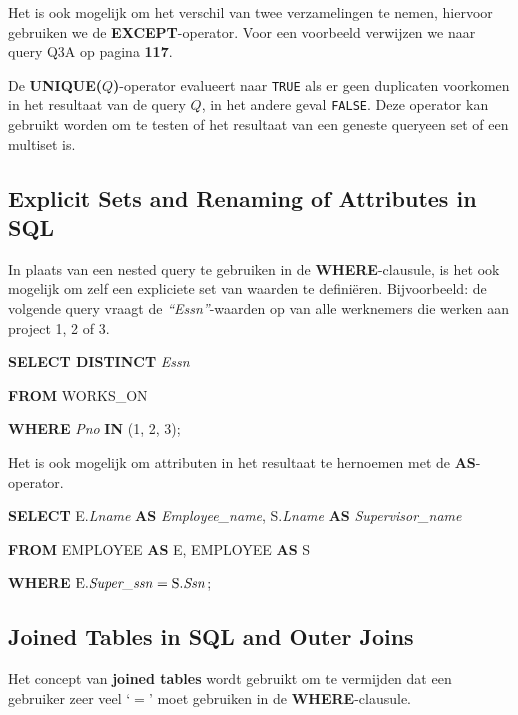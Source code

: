 \noindent Het is ook mogelijk om het verschil van twee verzamelingen te nemen, hiervoor gebruiken we de \textbf{EXCEPT}-operator. Voor een voorbeeld verwijzen we naar query Q3A op pagina \textbf{117}.

De \textbf{UNIQUE($Q$)}-operator evalueert naar \texttt{TRUE} als er geen duplicaten voorkomen in het resultaat van de query $Q$, in het andere geval \texttt{FALSE}. Deze operator kan gebruikt worden om te testen of het resultaat van een geneste queryeen set of een multiset is.


\subsection{Explicit Sets and Renaming of Attributes in SQL}
In plaats van een nested query te gebruiken in de \textbf{WHERE}-clausule, is het ook mogelijk om zelf een expliciete set van waarden te defini\"eren. Bijvoorbeeld: de volgende query vraagt de \textit{``Essn''}-waarden op van alle werknemers die werken aan project 1, 2 of 3.

\vspace{1mm}\hspace{10mm}
\textbf{SELECT DISTINCT} \textit{Essn}

\hspace{10mm}
\textbf{FROM} WORKS\_ON

\hspace{10mm}
\textbf{WHERE} \textit{Pno} \textbf{IN} (1, 2, 3);
\vspace{3mm}

\noindent Het is ook mogelijk om attributen in het resultaat te hernoemen met de \textbf{AS}-operator.

\vspace{1mm}\hspace{10mm}
\textbf{SELECT} E.\textit{Lname} \textbf{AS} \textit{Employee\_name}, S.\textit{Lname} \textbf{AS} \textit{Supervisor\_name}

\hspace{10mm}
\textbf{FROM} EMPLOYEE \textbf{AS} E, EMPLOYEE \textbf{AS} S

\hspace{10mm}
\textbf{WHERE} $\text{E.\textit{Super\_ssn}} = \text{S.\textit{Ssn}}$;


\subsection{Joined Tables in SQL and Outer Joins}
Het concept van \textbf{joined tables} wordt gebruikt om te vermijden dat een gebruiker zeer veel `$=$' moet gebruiken in de \textbf{WHERE}-clausule.

